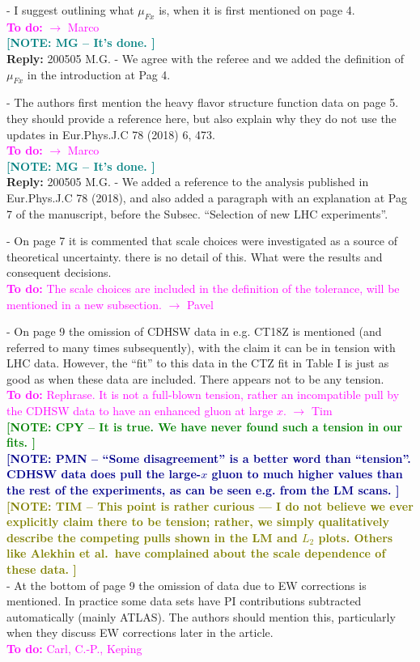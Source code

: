 \documentclass[aps,prd,amsmath,nofootinbib,floatfix,fleqn]{revtex4}
\newcommand{\TODO}[1]{\textcolor{magenta}{
\quad\vspace{3pt} \\ {\bf To do:} #1 \\
}}
\newcommand{\REPLY}[1]{\textcolor{redish}{\quad \\
{\bf Reply:} #1 \\
}}
\newcommand{\NOTECPY}[1]{\textcolor{green}{ \bf[NOTE: CPY -- #1 ]}}
\newcommand{\NOTEPN}[1]{\textcolor{darkblue}{ \bf[NOTE: PMN -- #1 ]}}
\newcommand{\NOTETIM}[1]{\textcolor{olive}{ \bf[NOTE: TIM -- #1 ]}}
\newcommand{\NOTEMG}[1]{\textcolor{teal}{ \bf[NOTE: MG -- #1 ]}}
\begin{document}
- I suggest outlining what $\mu_{Fx}$ is, when it is first mentioned on page 4.
\TODO{$\to$ Marco}
\NOTEMG{It's done.}
\REPLY{200505 M.G. - We agree with the referee and we added the definition of $\mu_{Fx}$ in the introduction at Pag 4.}

- The authors first mention the heavy flavor structure function data on page 5.
they should provide a reference here, but also explain why they do not use the
updates in Eur.Phys.J.C 78 (2018) 6, 473.
\TODO{$\to$ Marco}
\NOTEMG{It's done.}
\REPLY{200505 M.G. - We added a reference to the analysis published in  Eur.Phys.J.C 78 (2018), and also added a paragraph with an explanation at Pag 7 of the manuscript, before the Subsec. ``Selection of new LHC experiments''.}




- On page 7 it is commented that scale choices were investigated as a source of
theoretical uncertainty. there is no detail of this. What were the results and
consequent decisions.
\TODO{The scale choices are included in the definition of the tolerance, will be mentioned in a new subsection. $\to$ Pavel}

- On page 9 the omission of CDHSW data in e.g. CT18Z is mentioned (and referred
to many times subsequently), with the claim it can be in tension with LHC data.
However, the ``fit'' to this data in the CTZ fit in Table I is just as good as
when these data are included. There appears not to be any tension.
\TODO{Rephrase. It is not a full-blown tension, rather an incompatible pull by the CDHSW data to have an enhanced gluon at large $x$. $\to$ Tim}
\NOTECPY{It is true. We have never found such a tension in our fits. }\\
\NOTEPN{``Some disagreement'' is a better word than ``tension''. CDHSW data does pull the large-$x$ gluon to much higher values than the rest of the experiments, as can be seen e.g. from the LM scans.}\\
\NOTETIM{This point is rather curious --- I do not believe we ever explicitly claim there to
be tension; rather, we simply qualitatively describe the competing pulls shown in the LM
and $L_2$ plots. Others like Alekhin et al.~have complained about the scale dependence of
these data.}\\


- At the bottom of page 9 the omission of data due to EW corrections is
mentioned. In practice some data sets have PI contributions subtracted
automatically (mainly ATLAS). The authors should mention this, particularly when
they discuss EW corrections later in the article.
\TODO{Carl, C.-P., Keping}
\end{document}
